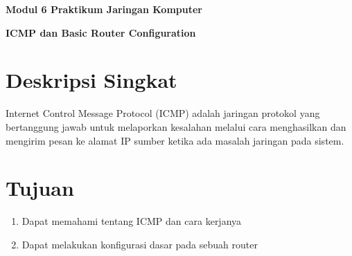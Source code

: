 \documentclass{article}
\begin{document}
    \begin{center}
        \textbf{Modul 6 Praktikum Jaringan Komputer}

        \textbf{ICMP dan Basic Router Configuration}
    \end{center}

    \section*{Deskripsi Singkat}
    \begin{flushleft}
        Internet Control Message Protocol (ICMP) adalah  jaringan protokol yang bertanggung jawab untuk melaporkan kesalahan melalui cara menghasilkan dan mengirim pesan ke alamat IP sumber ketika ada masalah jaringan pada sistem. 
    \end{flushleft}

    \section*{Tujuan}
    \begin{enumerate}
        \item Dapat memahami tentang ICMP dan cara kerjanya
        \item Dapat melakukan konfigurasi dasar pada sebuah router
    \end{enumerate}
\end{document}
